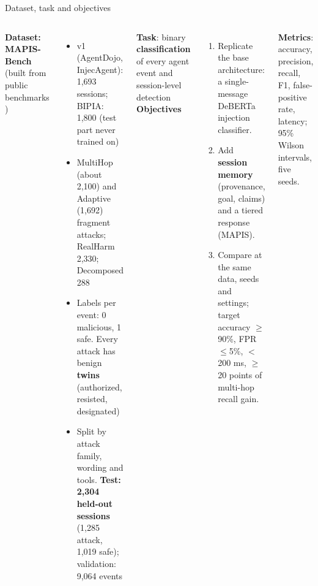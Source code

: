 \documentclass[aspectratio=169,10pt]{beamer}
\begin{document}
\begin{frame}{Dataset, task and objectives}
  \begin{columns}[T]
    \textbf{Dataset: MAPIS-Bench} (built from public benchmarks \cite{debenedetti2024,zhan2024,yi2023,zhang2024asb})
    \begin{itemize}\small
      \item v1 (AgentDojo, InjecAgent): 1,693 sessions; BIPIA: 1,800 (test part never trained on)
      \item MultiHop (about 2,100) and Adaptive (1,692) fragment attacks; RealHarm 2,330; Decomposed 288
      \item Labels per event: 0 malicious, 1 safe. Every attack has benign \textbf{twins} (authorized, resisted, designated)
      \item Split by attack family, wording and tools. \textbf{Test: 2,304 held-out sessions} (1,285 attack, 1,019 safe); validation: 9,064 events
    \end{itemize}
    \textbf{Task}: binary \textbf{classification} of every agent event and session-level detection\\[2mm]
    \textbf{Objectives}
    \begin{enumerate}\small
      \item Replicate the base architecture: a single-message DeBERTa injection classifier.
      \item Add \textbf{session memory} (provenance, goal, claims) and a tiered response (MAPIS).
      \item Compare at the same data, seeds and settings; target accuracy $\ge$90\%, FPR $\le$5\%, $<$200 ms, $\ge$20 points of multi-hop recall gain.
    \end{enumerate}
    \textbf{Metrics}: accuracy, precision, recall, F1, false-positive rate, latency; 95\% Wilson intervals, five seeds.
  \end{columns}
\end{frame}

\end{document}
